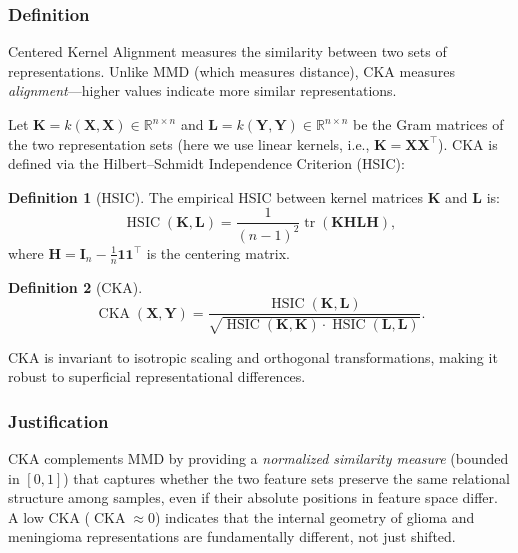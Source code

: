 \documentclass[11pt,a4paper]{article}
\DeclareMathOperator{\tr}{tr}
\DeclareMathOperator{\HSIC}{HSIC}
\DeclareMathOperator{\CKA}{CKA}
\newcommand{\R}{\mathbb{R}}
\theoremstyle{definition}
\newtheorem{definition}{Definition}
\begin{document}
\subsubsection{Definition}

Centered Kernel Alignment \cite{kornblith2019similarity} measures the similarity between two sets of representations. Unlike MMD (which measures distance), CKA measures \emph{alignment}---higher values indicate more similar representations.

Let $\bm{K} = k(\bm{X}, \bm{X}) \in \R^{n \times n}$ and $\bm{L} = k(\bm{Y}, \bm{Y}) \in \R^{n \times n}$ be the Gram matrices of the two representation sets (here we use linear kernels, i.e., $\bm{K} = \bm{X}\bm{X}^\top$). CKA is defined via the Hilbert--Schmidt Independence Criterion (HSIC):

\begin{definition}[HSIC]
The empirical HSIC between kernel matrices $\bm{K}$ and $\bm{L}$ is:
\begin{equation}\label{eq:hsic}
  \HSIC(\bm{K}, \bm{L}) = \frac{1}{(n-1)^2} \tr(\bm{K} \bm{H} \bm{L} \bm{H}),
\end{equation}
where $\bm{H} = \bm{I}_n - \frac{1}{n}\bm{1}\bm{1}^\top$ is the centering matrix.
\end{definition}

\begin{definition}[CKA]
\begin{equation}\label{eq:cka}
  \CKA(\bm{X}, \bm{Y}) = \frac{\HSIC(\bm{K}, \bm{L})}{\sqrt{\HSIC(\bm{K}, \bm{K}) \cdot \HSIC(\bm{L}, \bm{L})}}.
\end{equation}
\end{definition}

CKA is invariant to isotropic scaling and orthogonal transformations, making it robust to superficial representational differences.

\subsubsection{Justification}

CKA complements MMD by providing a \emph{normalized similarity measure} (bounded in $[0, 1]$) that captures whether the two feature sets preserve the same relational structure among samples, even if their absolute positions in feature space differ. A low CKA ($\CKA \approx 0$) indicates that the internal geometry of glioma and meningioma representations are fundamentally different, not just shifted.
\end{document}
